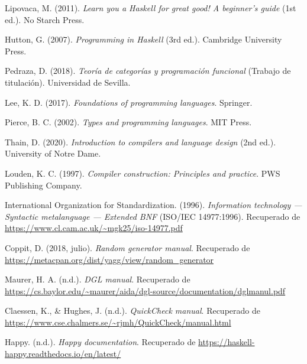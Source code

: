\documentclass[11pt]{article}
\begin{document}
\begin{thebibliography}{12}
  Lipovaca, M. (2011). \textit{Learn you a Haskell for great good! A beginner's guide} (1st ed.). No Starch Press.

  Hutton, G. (2007). \textit{Programming in Haskell} (3rd ed.). Cambridge University Press.

  Pedraza, D. (2018). \textit{Teoría de categorías y programación funcional} (Trabajo de titulación). Universidad de Sevilla.
  
  Lee, K. D. (2017). \textit{Foundations of programming languages}. Springer.
  
  Pierce, B. C. (2002). \textit{Types and programming languages}. MIT Press.

  Thain, D. (2020). \textit{Introduction to compilers and language design} (2nd ed.). University of Notre Dame.

  Louden, K. C. (1997). \textit{Compiler construction: Principles and practice}. PWS Publishing Company.

  International Organization for Standardization. (1996). \textit{Information technology — Syntactic metalanguage — Extended BNF} (ISO/IEC 14977:1996). Recuperado de \url{https://www.cl.cam.ac.uk/~mgk25/iso-14977.pdf}

  Coppit, D. (2018, julio). \textit{Random generator manual}. Recuperado de \url{https://metacpan.org/dist/yagg/view/random_generator}

  Maurer, H. A. (n.d.). \textit{DGL manual}. Recuperado de \url{https://cs.baylor.edu/~maurer/aida/dgl-source/documentation/dglmanul.pdf}

  Claessen, K., \& Hughes, J. (n.d.). \textit{QuickCheck manual}. Recuperado de \url{https://www.cse.chalmers.se/~rjmh/QuickCheck/manual.html}

  Happy. (n.d.). \textit{Happy documentation}. Recuperado de \url{https://haskell-happy.readthedocs.io/en/latest/}
  
\end{thebibliography}
\end{document}
